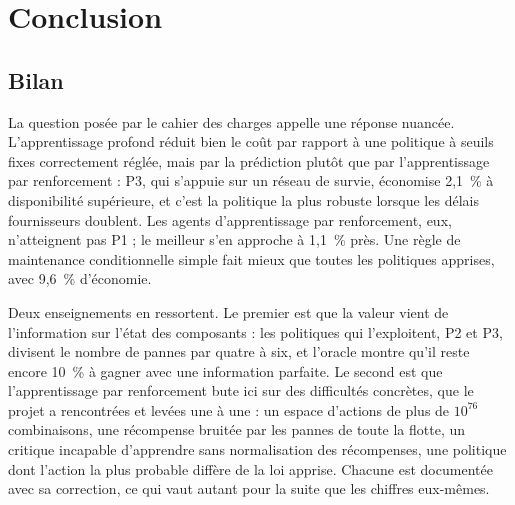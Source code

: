 \section{Conclusion}\label{sec:conclusion}

\subsection{Bilan}

La question posée par le cahier des charges appelle une réponse nuancée. L'apprentissage profond réduit bien le coût par rapport à une politique à seuils fixes correctement réglée, mais par la prédiction plutôt que par l'apprentissage par renforcement : P3, qui s'appuie sur un réseau de survie, économise 2,1~\% à disponibilité supérieure, et c'est la politique la plus robuste lorsque les délais fournisseurs doublent. Les agents d'apprentissage par renforcement, eux, n'atteignent pas P1 ; le meilleur s'en approche à 1,1~\% près. Une règle de maintenance conditionnelle simple fait mieux que toutes les politiques apprises, avec 9,6~\% d'économie.

Deux enseignements en ressortent. Le premier est que la valeur vient de l'information sur l'état des composants : les politiques qui l'exploitent, P2 et P3, divisent le nombre de pannes par quatre à six, et l'oracle montre qu'il reste encore 10~\% à gagner avec une information parfaite. Le second est que l'apprentissage par renforcement bute ici sur des difficultés concrètes, que le projet a rencontrées et levées une à une : un espace d'actions de plus de $10^{76}$ combinaisons, une récompense bruitée par les pannes de toute la flotte, un critique incapable d'apprendre sans normalisation des récompenses, une politique dont l'action la plus probable diffère de la loi apprise. Chacune est documentée avec sa correction, ce qui vaut autant pour la suite que les chiffres eux-mêmes.

